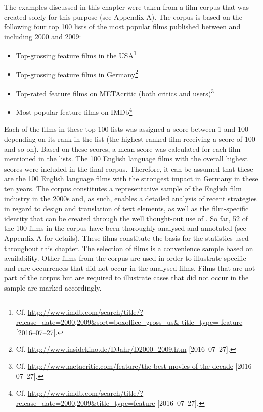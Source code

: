The examples discussed in this chapter were taken from a film corpus that was created solely for this purpose (see Appendix A). The corpus is based on the following four top 100 lists of the most popular films published between and including 2000 and 2009:

\begin{itemize}
\item Top-grossing feature films in the USA\footnote{Cf. \url{http://www.imdb.com/search/title/?release\_date=2000,2009\&sort=boxoffice\_gross\_us\& title\_type= feature} [2016--07--27].}
\item Top-grossing feature films in Germany\footnote{Cf. \url{http://www.insidekino.de/DJahr/D2000--2009.htm} [2016--07--27].}
\item Top-rated feature films on METAcritic (both critics and users)\footnote{Cf. \url{http://www.metacritic.com/feature/the-best-movies-of-the-decade} [2016--07--27].}
\item Most popular feature films on IMDb\footnote{Cf. \url{http://www.imdb.com/search/title/?release\_date=2000,2009\&title\_type=feature} [2016--07--27].}
\end{itemize}

Each of the films in these top 100 lists was assigned a score between 1 and 100 depending on its rank in the list (the highest-ranked film receiving a score of 100 and so on). Based on these scores, a mean score was calculated for each film mentioned in the lists. The 100 English language films with the overall highest scores were included in the final corpus. Therefore, it can be assumed that these are the 100 English language films with the strongest impact in Germany in these ten years. The corpus constitutes a representative sample of the English film industry in the 2000s and, as such, enables a detailed analysis of recent strategies in regard to design and translation of text elements, as well as the film-specific identity that can be created through the well thought-out use of . So far, 52 of the 100 films in the corpus have been thoroughly analysed and annotated (see Appendix A for details). These films constitute the basis for the statistics used throughout this chapter. The selection of films is a convenience sample based on availability. Other films from the corpus are used in order to illustrate specific and rare occurrences that did not occur in the analysed films. Films that are not part of the corpus but are required to illustrate cases that did not occur in the sample are marked accordingly.

